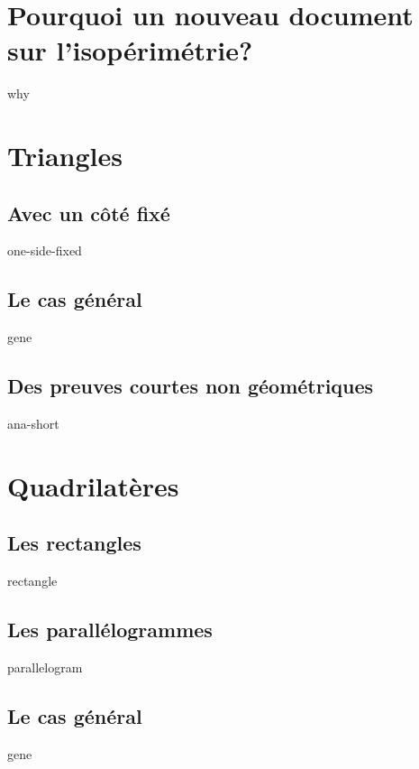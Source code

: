 \documentclass[12pt]{amsart}
\begin{document}
\section{Pourquoi un  nouveau document sur l'isopérimétrie?}
{why}




\section{Triangles}

\subsection{Avec un côté fixé}
{one-side-fixed}


\subsection{Le cas général}
{gene}


\subsection{Des preuves courtes non géométriques}
{ana-short}




\section{Quadrilatères}

\subsection{Les rectangles}
{rectangle}


\subsection{Les parallélogrammes}
{parallelogram}


\subsection{Le cas général}
{gene}


\end{document}
